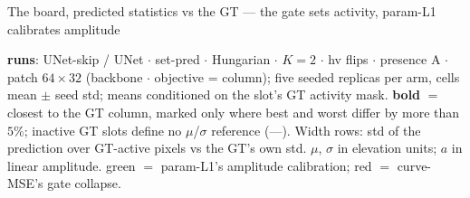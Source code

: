 \begin{frame}{The board, predicted statistics vs the GT --- the gate sets activity, param-L1 calibrates amplitude}
  \parbox{0.82\textwidth}{\tiny\color{soft} \textbf{runs}: UNet-skip / UNet $\cdot$ set-pred $\cdot$
   Hungarian $\cdot$ $K{=}2$ $\cdot$ hv flips $\cdot$ presence A $\cdot$ patch
   $64{\times}32$ (backbone $\cdot$ objective = column); five seeded replicas per
   arm, cells mean $\pm$ seed std; means conditioned on the slot's GT activity
   mask. \textbf{bold} $=$ closest to the \textcolor{good}{GT} column, marked only where best and worst differ by more than $5\%$; inactive GT
   slots define no $\mu$/$\sigma$ reference (---). Width rows: std of the
   prediction over GT-active pixels vs the GT's own std. $\mu$, $\sigma$ in
   elevation units; $a$ in linear amplitude. \textcolor{good}{green} $=$ param-L1's amplitude calibration; \textcolor{accent}{red} $=$ curve-MSE's gate collapse.\par}
    

\end{frame}

